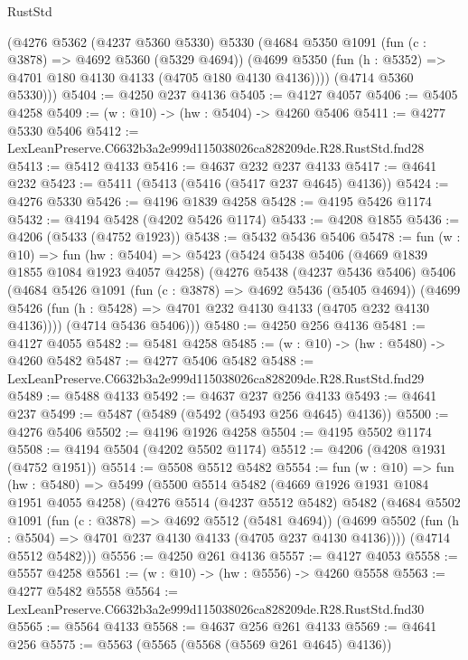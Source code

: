 \begin{lexlean}{RustStd}
\begin{coremodule}
      (@4276
        @5362
        (@4237 @5360 @5330)
        @5330
        (@4684
          @5350
          @1091
          (fun (c : @3878) => @4692 @5360 (@5329 @4694))
          (@4699 @5350 (fun (h : @5352) => @4701 @180 @4130 @4133 (@4705 @180 @4130 @4136))))
        (@4714 @5360 @5330)))
@5404 := @4250 @237 @4136
@5405 := @4127 @4057
@5406 := @5405 @4258
@5409 := (w : @10) -> (hw : @5404) -> @4260 @5406
@5411 := @4277 @5330 @5406
@5412 := LexLeanPreserve.C6632b3a2e999d115038026ca828209de.R28.RustStd.fnd28
@5413 := @5412 @4133
@5416 := @4637 @232 @237 @4133
@5417 := @4641 @232
@5423 := @5411 (@5413 (@5416 (@5417 @237 @4645) @4136))
@5424 := @4276 @5330
@5426 := @4196 @1839 @4258
@5428 := @4195 @5426 @1174
@5432 := @4194 @5428 (@4202 @5426 @1174)
@5433 := @4208 @1855
@5436 := @4206 (@5433 (@4752 @1923))
@5438 := @5432 @5436 @5406
@5478 := fun (w : @10) =>
  fun (hw : @5404) =>
  @5423
    (@5424
      @5438
      @5406
      (@4669 @1839 @1855 @1084 @1923 @4057 @4258)
      (@4276
        @5438
        (@4237 @5436 @5406)
        @5406
        (@4684
          @5426
          @1091
          (fun (c : @3878) => @4692 @5436 (@5405 @4694))
          (@4699 @5426 (fun (h : @5428) => @4701 @232 @4130 @4133 (@4705 @232 @4130 @4136))))
        (@4714 @5436 @5406)))
@5480 := @4250 @256 @4136
@5481 := @4127 @4055
@5482 := @5481 @4258
@5485 := (w : @10) -> (hw : @5480) -> @4260 @5482
@5487 := @4277 @5406 @5482
@5488 := LexLeanPreserve.C6632b3a2e999d115038026ca828209de.R28.RustStd.fnd29
@5489 := @5488 @4133
@5492 := @4637 @237 @256 @4133
@5493 := @4641 @237
@5499 := @5487 (@5489 (@5492 (@5493 @256 @4645) @4136))
@5500 := @4276 @5406
@5502 := @4196 @1926 @4258
@5504 := @4195 @5502 @1174
@5508 := @4194 @5504 (@4202 @5502 @1174)
@5512 := @4206 (@4208 @1931 (@4752 @1951))
@5514 := @5508 @5512 @5482
@5554 := fun (w : @10) =>
  fun (hw : @5480) =>
  @5499
    (@5500
      @5514
      @5482
      (@4669 @1926 @1931 @1084 @1951 @4055 @4258)
      (@4276
        @5514
        (@4237 @5512 @5482)
        @5482
        (@4684
          @5502
          @1091
          (fun (c : @3878) => @4692 @5512 (@5481 @4694))
          (@4699 @5502 (fun (h : @5504) => @4701 @237 @4130 @4133 (@4705 @237 @4130 @4136))))
        (@4714 @5512 @5482)))
@5556 := @4250 @261 @4136
@5557 := @4127 @4053
@5558 := @5557 @4258
@5561 := (w : @10) -> (hw : @5556) -> @4260 @5558
@5563 := @4277 @5482 @5558
@5564 := LexLeanPreserve.C6632b3a2e999d115038026ca828209de.R28.RustStd.fnd30
@5565 := @5564 @4133
@5568 := @4637 @256 @261 @4133
@5569 := @4641 @256
@5575 := @5563 (@5565 (@5568 (@5569 @261 @4645) @4136))

\end{coremodule}
\end{lexlean}
